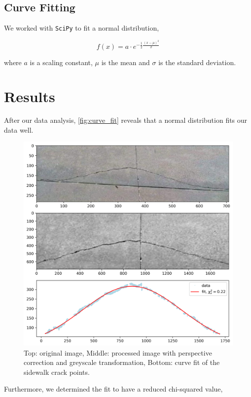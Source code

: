 \documentclass{article}
\begin{document}
\subsection{Curve Fitting}

We worked with \texttt{SciPy} \cite{2020NumPy-Array} to fit a normal distribution,

\[
f(x) = a \cdot e^{-\frac{1}{2} \frac{(x-\mu)^2}{\sigma}}
\]

where $a$ is a scaling constant, $\mu$ is the mean and $\sigma$ is the standard deviation.


\section{Results}

After our data analysis, \autoref{fig:curve_fit} reveals that a normal distribution fits our data well.

\begin{figure}[h]
    \centering
    \includegraphics[width=13cm]{fit.png}
    \caption{Top: original image, Middle: processed image with perspective correction and greyscale transformation, Bottom: curve fit of the sidewalk crack points.}
    \label{fig:curve_fit}
\end{figure}

Furthermore, we determined the fit to have a reduced chi-squared value,
\end{document}
